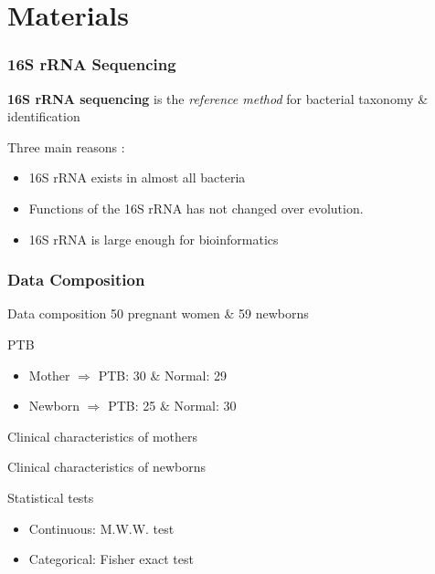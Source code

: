 \documentclass{beamer}
\begin{document}
    \section{Materials}
    \begin{frame}
        \frametitle{16S rRNA Sequencing}

        \textbf{16S rRNA sequencing} is the \textit{reference method} for bacterial taxonomy \& identification \cite{16S1}

        Three main reasons \cite{16S2}:
        \begin{itemize}
            \item 16S rRNA exists in almost all bacteria
            \item Functions of the 16S rRNA has not changed over evolution.
            \item 16S rRNA is large enough for bioinformatics
        \end{itemize}
    \end{frame}

    \begin{frame}[allowframebreaks]
        \frametitle{Data Composition}

        \begin{block}{Data composition}
            50 pregnant women \& 59 newborns
        \end{block}

        \begin{block}{PTB}
            \begin{itemize}
                \item Mother $\Rightarrow$ PTB: 30 \& Normal: 29
                \item Newborn $\Rightarrow$ PTB: 25 \& Normal: 30
            \end{itemize}
        \end{block}
        \pagebreak

        \begin{table}
            \centering
            \caption{Clinical characteristics of mothers}
            \resizebox{!}{\ifdimcomp{\height}{<}{0.35 \textheight}{\height}{0.35 \textheight}}
            {}
        \end{table}

        \begin{table}
            \centering
            \caption{Clinical characteristics of newborns}
            \resizebox{!}{\ifdimcomp{\height}{<}{0.25 \textheight}{\height}{0.25 \textheight}}
            {}
        \end{table}

        \begin{exampleblock}{Statistical tests}
            \begin{itemize}
                \item Continuous: M.W.W. test
                \item Categorical: Fisher exact test
            \end{itemize}
        \end{exampleblock}
    \end{frame}
\end{document}
